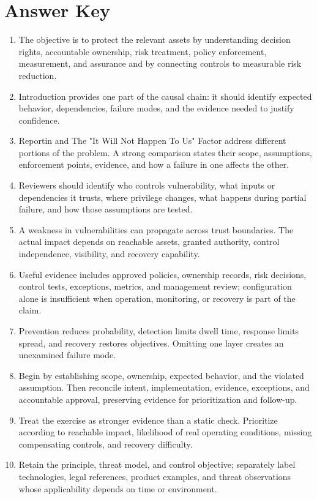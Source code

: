 \documentclass[11pt]{article}
\begin{document}
\section*{Answer Key}
\begin{enumerate}
\item The objective is to protect the relevant assets by understanding decision rights, accountable ownership, risk treatment, policy enforcement, measurement, and assurance and by connecting controls to measurable risk reduction.
\item Introduction provides one part of the causal chain: it should identify expected behavior, dependencies, failure modes, and the evidence needed to justify confidence.
\item Reportin and The "It Will Not Happen To Us" Factor address different portions of the problem. A strong comparison states their scope, assumptions, enforcement points, evidence, and how a failure in one affects the other.
\item Reviewers should identify who controls vulnerability, what inputs or dependencies it trusts, where privilege changes, what happens during partial failure, and how those assumptions are tested.
\item A weakness in vulnerabilities can propagate across trust boundaries. The actual impact depends on reachable assets, granted authority, control independence, visibility, and recovery capability.
\item Useful evidence includes approved policies, ownership records, risk decisions, control tests, exceptions, metrics, and management review; configuration alone is insufficient when operation, monitoring, or recovery is part of the claim.
\item Prevention reduces probability, detection limits dwell time, response limits spread, and recovery restores objectives. Omitting one layer creates an unexamined failure mode.
\item Begin by establishing scope, ownership, expected behavior, and the violated assumption. Then reconcile intent, implementation, evidence, exceptions, and accountable approval, preserving evidence for prioritization and follow-up.
\item Treat the exercise as stronger evidence than a static check. Prioritize according to reachable impact, likelihood of real operating conditions, missing compensating controls, and recovery difficulty.
\item Retain the principle, threat model, and control objective; separately label technologies, legal references, product examples, and threat observations whose applicability depends on time or environment.
\end{enumerate}
\end{document}
